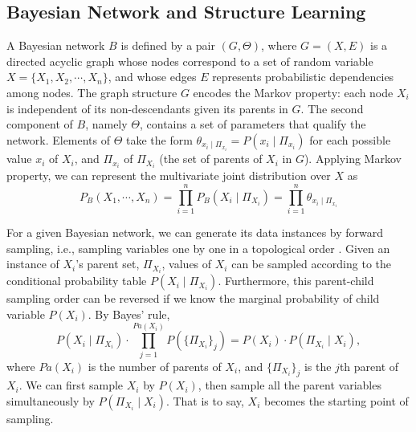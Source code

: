 {\subsection{Bayesian Network and Structure Learning}
\label{BN_basic}
A Bayesian network $B$ is defined by a pair $(G,\Theta)$, where $G = (X,E)$ is a directed acyclic graph whose nodes correspond to a set of random variable $X = \{  X_1, X_2, \cdots, X_n \}$, and whose edges $E$ represents probabilistic dependencies among nodes. The graph structure $G$ encodes the Markov property: each node $X_i$ is independent of its non-descendants given its parents in $G$. The second component of $B$, namely $\Theta$, contains a set of parameters that qualify the network. Elements of $\Theta$ take the form $\theta_{x_i \mid \Pi_{x_i}} = P(x_i \mid \Pi_{x_i})$ for each possible value $x_i$ of $X_i$, and $\Pi_{x_i}$ of $\Pi_{X_i}$ (the set of parents of $X_i$ in $G$). Applying Markov property, we can represent the multivariate joint distribution over $X$ as
\begin{equation}
P_B (X_1 , \cdots, X_n) = \prod_{i=1}^{n} P_B (X_i \mid \Pi_{X_i}) = \prod_{i=1}^{n} \theta_{x_i \mid \Pi_{x_i}}
\end{equation}

For a given Bayesian network, we can generate its data instances by forward sampling, i.e., sampling variables one by one in a topological order \citep[see][chap.~22]{algo_2009}. Given an instance of $X_i$'s parent set, $\Pi_{X_i}$, values of $X_i$ can be sampled according to the conditional probability table $P(X_i \mid \Pi_{X_i})$. Furthermore, this parent-child sampling order can be reversed if we know the marginal probability of child variable $P(X_i)$. By Bayes' rule,
\begin{equation}
P(X_i \mid \Pi_{X_i}) \cdot \prod_{j = 1}^{ Pa( X_i)} P( \{ \Pi_{X_i} \}_j) = P(X_i) \cdot P(\Pi_{X_i} \mid X_i),
\end{equation}
where $Pa( X_i)$ is the number of parents of $X_i$, and $\{ \Pi_{X_i} \}_j$ is the $j$th parent of $X_i$. We can first sample $X_i$ by $P(X_i)$, then sample all the parent variables simultaneously by $P(\Pi_{X_i} \mid X_i)$. That is to say, $X_i$ becomes the starting point of sampling.

}
